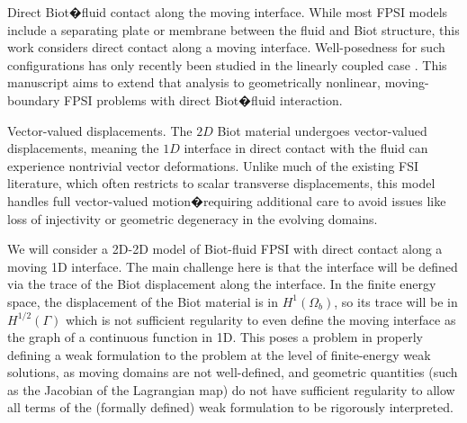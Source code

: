 \documentclass[11pt]{article}
\theoremstyle{definition}
\begin{document}
    Direct Biot�fluid contact along the moving interface. While most FPSI models include a separating plate or membrane between the fluid and Biot structure, this work considers direct contact along a moving interface. Well-posedness for such configurations has only recently been studied in the linearly coupled case \cite{Gurvich}. This manuscript aims to extend that analysis to geometrically nonlinear, moving-boundary FPSI problems with direct Biot�fluid interaction.

    Vector-valued displacements. The $2D$ Biot material undergoes vector-valued displacements, meaning the $1D$ interface in direct contact with the fluid can experience nontrivial vector deformations. Unlike much of the existing FSI literature, which often restricts to scalar transverse displacements, this model handles full vector-valued motion�requiring additional care to avoid issues like loss of injectivity or geometric degeneracy in the evolving domains.

We will consider a 2D-2D model of Biot-fluid FPSI with direct contact along a moving 1D interface. The main challenge here is that the interface will be defined via the trace of the Biot displacement along the interface. In the finite energy space, the displacement of the Biot material is in $H^{1}(\Omega_{b})$, so its trace will be in $H^{1/2}(\Gamma)$ which is not sufficient regularity to even define the moving interface as the graph of a continuous function in 1D. This poses a problem in properly defining a weak formulation to the problem at the level of finite-energy weak solutions, as moving domains are not well-defined, and geometric quantities (such as the Jacobian of the Lagrangian map) do not have sufficient regularity to allow all terms of the (formally defined) weak formulation to be rigorously interpreted. 
\end{document}
